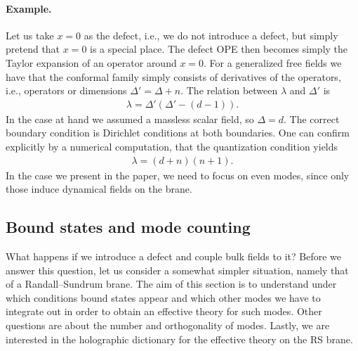\paragraph{Example. } Let us take $x=0$ as the defect, i.e., we do not introduce a defect, but simply pretend that $x=0$ is a special place. The defect OPE then becomes simply the Taylor expansion of an operator around $x=0$. For a generalized free fields we have that the conformal family simply consists of derivatives of the operators, i.e., operators or dimensions $\Delta' = \Delta + n$. The relation between $\lambda$ and $\Delta'$ is 
\begin{align}
    \lambda = \Delta'(\Delta'-(d-1)).
\end{align}
In the case at hand we assumed a massless scalar field, so $\Delta = d$. The correct boundary condition is Dirichlet conditions at both boundaries. One can confirm explicitly by a numerical computation, that the quantization condition yields
\begin{align}
    \lambda = (d+n)(n+1).
\end{align}
In the case we present in the paper, we need to focus on even modes, since only those induce dynamical fields on the brane.

\subsection{Bound states and mode counting}
What happens if we introduce a defect and couple bulk fields to it? Before we answer this question, let us consider a somewhat simpler situation, namely that of a Randall--Sundrum brane. The aim of this section is to understand under which conditions bound states appear and which other modes we have to integrate out in order to obtain an effective theory for such modes. Other questions are about the number and orthogonality of modes. Lastly, we are interested in the holographic dictionary for the effective theory on the RS brane. 

